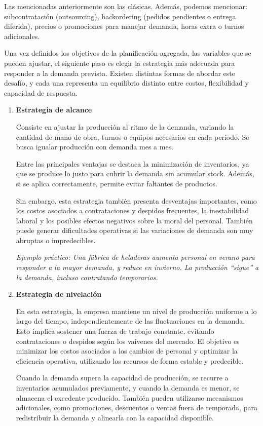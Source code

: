 \documentclass[a4paper,oneside,11pt]{article}
\begin{document}
Las mencionadas anteriormente son las clásicas. Además, podemos mencionar: subcontratación (outsourcing), backordering (pedidos pendientes o entrega diferida), precios o promociones para manejar demanda, horas extra o turnos adicionales.

Una vez definidos los objetivos de la planificación agregada, las variables que se pueden ajustar, el siguiente paso es elegir la estrategia más adecuada para responder a la demanda prevista. Existen distintas formas de abordar este desafío, y cada una representa un equilibrio distinto entre costos, flexibilidad y capacidad de respuesta.

\begin{enumerate}
    \item \textbf{Estrategia de alcance}

    Consiste en ajustar la producción al ritmo de la demanda, variando la cantidad de mano de obra, turnos o equipos necesarios en cada período. Se busca igualar 
    producción con demanda mes a mes.

    Entre las principales ventajas se destaca la minimización de inventarios, ya que se produce lo justo para cubrir la demanda sin acumular stock. Además, si se aplica correctamente, permite evitar faltantes de productos.

    Sin embargo, esta estrategia también presenta desventajas importantes, como los costos asociados a contrataciones y despidos frecuentes, la inestabilidad laboral y los posibles efectos negativos sobre la moral del personal. También puede generar dificultades operativas si las variaciones de demanda son muy abruptas o impredecibles.

    \textit{Ejemplo práctico:
    Una fábrica de heladeras aumenta personal en verano para responder a la mayor demanda, y reduce en invierno. La producción “sigue” a la demanda, incluso contratando temporarios.}

    \item \textbf{Estrategia de nivelación}

    En esta estrategia, la empresa mantiene un nivel de producción uniforme a lo largo del tiempo, independientemente de las fluctuaciones en la demanda. Esto implica sostener una fuerza de trabajo constante, evitando contrataciones o despidos según los vaivenes del mercado. El objetivo es minimizar los costos asociados a los cambios de personal y optimizar la eficiencia operativa, utilizando los recursos de forma estable y predecible.

    Cuando la demanda supera la capacidad de producción, se recurre a inventarios acumulados previamente, y cuando la demanda es menor, se almacena el excedente producido. También pueden utilizarse mecanismos adicionales, como promociones, descuentos o ventas fuera de temporada, para redistribuir la demanda y alinearla con la capacidad disponible.
    

\end{enumerate}
\end{document}
